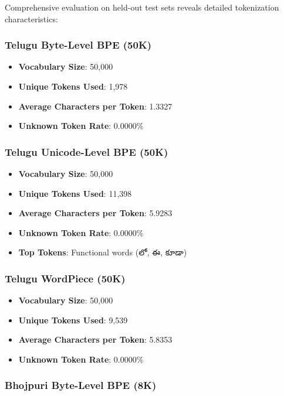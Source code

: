 \documentclass[11pt,a4paper]{article}
\begin{document}
Comprehensive evaluation on held-out test sets reveals detailed tokenization characteristics:

\subsubsection{Telugu Byte-Level BPE (50K)}

\begin{itemize}
    \item \textbf{Vocabulary Size}: 50,000
    \item \textbf{Unique Tokens Used}: 1,978
    \item \textbf{Average Characters per Token}: 1.3327
    \item \textbf{Unknown Token Rate}: 0.0000\%
\end{itemize}

\subsubsection{Telugu Unicode-Level BPE (50K)}

\begin{itemize}
    \item \textbf{Vocabulary Size}: 50,000
    \item \textbf{Unique Tokens Used}: 11,398
    \item \textbf{Average Characters per Token}: 5.9283
    \item \textbf{Unknown Token Rate}: 0.0000\%
    \item \textbf{Top Tokens}: Functional words ({\teluguFont లో}, {\teluguFont ఈ}, {\teluguFont కూడా})
\end{itemize}

\subsubsection{Telugu WordPiece (50K)}

\begin{itemize}
    \item \textbf{Vocabulary Size}: 50,000
    \item \textbf{Unique Tokens Used}: 9,539
    \item \textbf{Average Characters per Token}: 5.8353
    \item \textbf{Unknown Token Rate}: 0.0000\%

\end{itemize}

\subsubsection{Bhojpuri Byte-Level BPE (8K)}
\end{document}
